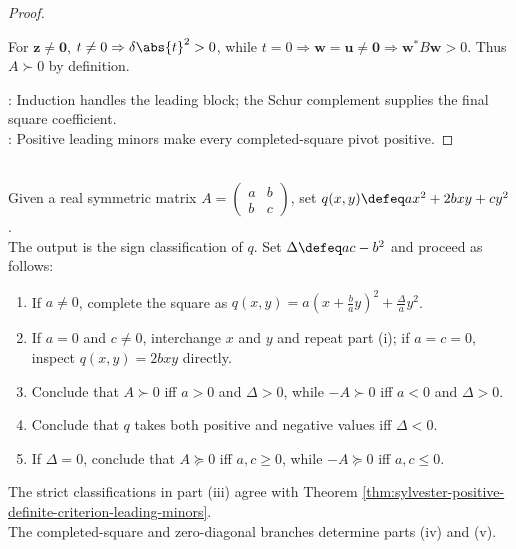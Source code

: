 \begin{theorem}
\begin{proof}
\begin{enumerate}[label=\roman*.]
For $\mathbf{z}\neq\mathbf{0}$, $t\neq0\Rightarrow\delta\abs{t}^2>0$, while $t=0\Rightarrow\mathbf{w}=\mathbf{u}\neq\mathbf{0}\Rightarrow\mathbf{w}^*B\mathbf{w}>0$. Thus $A\succ0$ by definition.
\end{enumerate}
: Induction handles the leading block; the Schur complement supplies the final square coefficient.\\
: Positive leading minors make every completed-square pivot positive.
\end{proof}
\end{theorem}

\begin{computationmethod} \label{meth:two-by-two-quadratic-form-test} \\
Given a real symmetric matrix $A=\left(\begin{smallmatrix}a&b\\b&c\end{smallmatrix}\right)$, set $q(x,y)\defeq ax^2+2bxy+cy^2$.\\
The output is the sign classification of $q$. Set $\Delta\defeq ac-b^2$ and proceed as follows:
\begin{enumerate}[label=(\roman*)]
\setlength{\itemsep}{0pt}
\item If $a\neq0$, complete the square as $q(x,y)=a\left(x+\frac{b}{a}y\right)^2+\frac{\Delta}{a}y^2$.
\item If $a=0$ and $c\neq0$, interchange $x$ and $y$ and repeat part (i); if $a=c=0$, inspect $q(x,y)=2bxy$ directly.
\item Conclude that $A\succ0$ iff $a>0$ and $\Delta>0$, while $-A\succ0$ iff $a<0$ and $\Delta>0$.
\item Conclude that $q$ takes both positive and negative values iff $\Delta<0$.
\item If $\Delta=0$, conclude that $A\succeq0$ iff $a,c\geq0$, while $-A\succeq0$ iff $a,c\leq0$.
\end{enumerate}
The strict classifications in part (iii) agree with Theorem \ref{thm:sylvester-positive-definite-criterion-leading-minors}.\\
The completed-square and zero-diagonal branches determine parts (iv) and (v).
\end{computationmethod}

